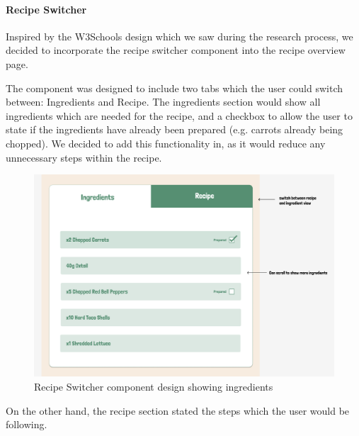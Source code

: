 \documentclass{article}
\begin{document}
\paragraph{Recipe Switcher}
Inspired by the W3Schools design which we saw during the research process, we decided to incorporate the recipe switcher component into the recipe overview page.

The component was designed to include two tabs which the user could switch between: Ingredients and Recipe. The ingredients section would show all ingredients which are needed for the recipe, and a checkbox to allow the user to state if the ingredients have already been prepared (e.g. carrots already being chopped). We decided to add this functionality in, as it would reduce any unnecessary steps within the recipe.

\begin{figure}[h]
  \includegraphics[width=1.0\textwidth]{assets/design-images/Version 1 Recipe Switcher ingredients.png}
  \centering
  \caption{Recipe Switcher component design showing ingredients}
\end{figure}

On the other hand, the recipe section stated the steps which the user would be following. 
\end{document}
